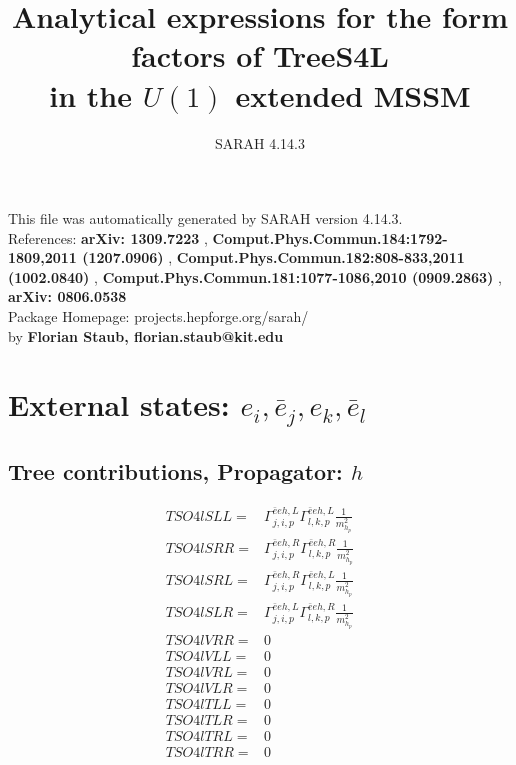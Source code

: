 \documentclass[A4,landscape]{article}
\begin{document}
\title{Analytical expressions for the form factors of TreeS4L\\ in the $U(1)$ extended MSSM } 
 \author{SARAH 4.14.3} 
 \maketitle 
 \vspace{10cm} 
This file was automatically generated by SARAH version 4.14.3.  \\ 
References: {\bf arXiv: 1309.7223 }, {\bf Comput.Phys.Commun.184:1792-1809,2011 (1207.0906) }, {\bf Comput.Phys.Commun.182:808-833,2011 (1002.0840) }, {\bf Comput.Phys.Commun.181:1077-1086,2010 (0909.2863) }, {\bf arXiv: 0806.0538 } \\ 
Package Homepage: projects.hepforge.org/sarah/ \\ 
by {\bf Florian Staub, florian.staub@kit.edu} 
 \pagebreak 
 \tableofcontents 
 \pagebreak 
\section{External states: ${e_{{i}}, \bar{e}_{{j}}, e_{{k}}, \bar{e}_{{l}}}$} 
\subsection{Tree contributions, Propagator: $h$} 

\begin{align} 
  TSO4lSLL= & \Gamma^{\bar{e}e h ,L}_{j, i, p} \Gamma^{\bar{e}e h ,L}_{l, k, p} \frac{1}{m^2_{h_{{p}}}} \\ 
  TSO4lSRR= & \Gamma^{\bar{e}e h ,R}_{j, i, p} \Gamma^{\bar{e}e h ,R}_{l, k, p} \frac{1}{m^2_{h_{{p}}}} \\ 
  TSO4lSRL= & \Gamma^{\bar{e}e h ,R}_{j, i, p} \Gamma^{\bar{e}e h ,L}_{l, k, p} \frac{1}{m^2_{h_{{p}}}} \\ 
  TSO4lSLR= & \Gamma^{\bar{e}e h ,L}_{j, i, p} \Gamma^{\bar{e}e h ,R}_{l, k, p} \frac{1}{m^2_{h_{{p}}}} \\ 
  TSO4lVRR= & 0 \\ 
  TSO4lVLL= & 0 \\ 
  TSO4lVRL= & 0 \\ 
  TSO4lVLR= & 0 \\ 
  TSO4lTLL= & 0 \\ 
  TSO4lTLR= & 0 \\ 
  TSO4lTRL= & 0 \\ 
  TSO4lTRR= & 0 \\ 
\end{align} 
\end{document}

